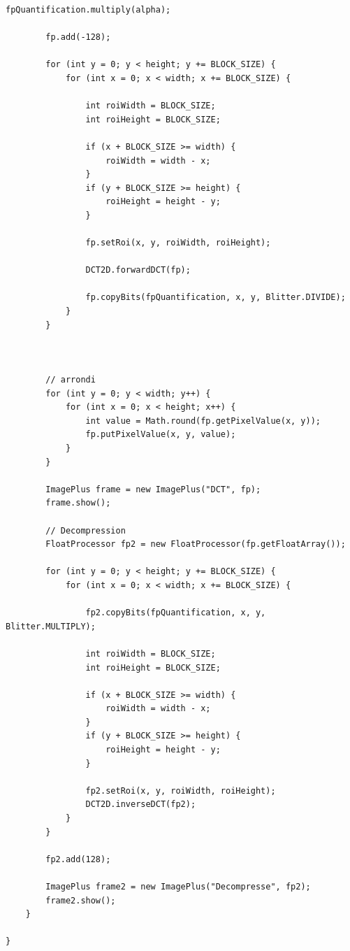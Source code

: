 \documentclass[a4paper,11pt]{article}
\begin{document}
\begin{lstlisting}[caption=Code principal du plug in]
		fpQuantification.multiply(alpha);
		
		fp.add(-128);

		for (int y = 0; y < height; y += BLOCK_SIZE) {
			for (int x = 0; x < width; x += BLOCK_SIZE) {

				int roiWidth = BLOCK_SIZE;
				int roiHeight = BLOCK_SIZE;

				if (x + BLOCK_SIZE >= width) {
					roiWidth = width - x;
				}
				if (y + BLOCK_SIZE >= height) {
					roiHeight = height - y;
				}

				fp.setRoi(x, y, roiWidth, roiHeight);

				DCT2D.forwardDCT(fp);
				
				fp.copyBits(fpQuantification, x, y, Blitter.DIVIDE);
			}
		}

		

		// arrondi
		for (int y = 0; y < width; y++) {
			for (int x = 0; x < height; x++) {
				int value = Math.round(fp.getPixelValue(x, y));
				fp.putPixelValue(x, y, value);
			}
		}

		ImagePlus frame = new ImagePlus("DCT", fp);
		frame.show();

		// Decompression
		FloatProcessor fp2 = new FloatProcessor(fp.getFloatArray());

		for (int y = 0; y < height; y += BLOCK_SIZE) {
			for (int x = 0; x < width; x += BLOCK_SIZE) {
				
				fp2.copyBits(fpQuantification, x, y, Blitter.MULTIPLY);

				int roiWidth = BLOCK_SIZE;
				int roiHeight = BLOCK_SIZE;

				if (x + BLOCK_SIZE >= width) {
					roiWidth = width - x;
				}
				if (y + BLOCK_SIZE >= height) {
					roiHeight = height - y;
				}

				fp2.setRoi(x, y, roiWidth, roiHeight);
				DCT2D.inverseDCT(fp2);
			}
		}

		fp2.add(128);

		ImagePlus frame2 = new ImagePlus("Decompresse", fp2);
		frame2.show();
	}

}
  \end{lstlisting}
  
\end{document}
